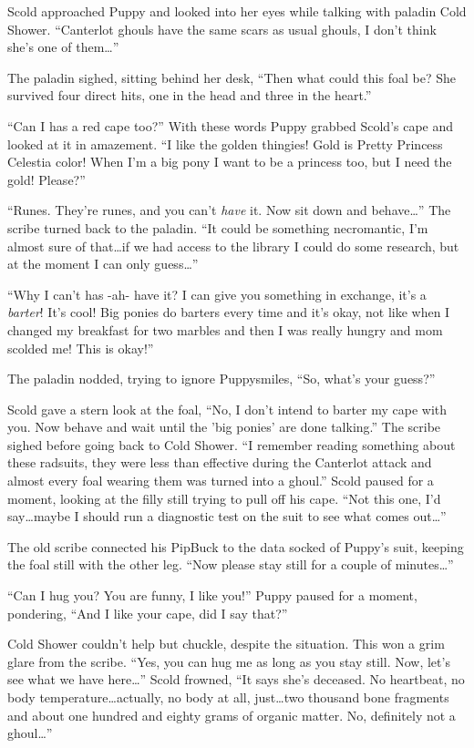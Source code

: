 Scold approached Puppy and looked into her eyes while talking with paladin Cold Shower. ``Canterlot ghouls have the same scars as usual ghouls, I don't think she's one of them\dots''

The paladin sighed, sitting behind her desk, ``Then what could this foal be? She survived four direct hits, one in the head and three in the heart.''

``Can I has a red cape too?'' With these words Puppy grabbed Scold's cape and looked at it in amazement. ``I like the golden thingies! Gold is Pretty Princess Celestia color! When I'm a big pony I want to be a princess too, but I need the gold! Please?''

``Runes. They're runes, and you can't \emph{have} it. Now sit down and behave\dots'' The scribe turned back to the paladin. ``It could be something necromantic, I'm almost sure of that\dots if we had access to the library I could do some research, but at the moment I can only guess\dots''

``Why I can't has -ah- have it? I can give you something in exchange, it's a \emph{barter}! It's cool! Big ponies do barters every time and it's okay, not like when I changed my breakfast for two marbles and then I was really hungry and mom scolded me! This is okay!''

The paladin nodded, trying to ignore Puppysmiles, ``So, what's your guess?''

Scold gave a stern look at the foal, ``No, I don't intend to barter my cape with you. Now behave and wait until the 'big ponies' are done talking.'' The scribe sighed before going back to Cold Shower. ``I remember reading something about these radsuits, they were less than effective during the Canterlot attack and almost every foal wearing them was turned into a ghoul.'' Scold paused for a moment, looking at the filly still trying to pull off his cape. ``Not this one, I'd say\dots maybe I should run a diagnostic test on the suit to see what comes out\dots''

The old scribe connected his PipBuck to the data socked of Puppy's suit, keeping the foal still with the other leg. ``Now please stay still for a couple of minutes\dots''

``Can I hug you? You are funny, I like you!'' Puppy paused for a moment, pondering, ``And I like your cape, did I say that?''

Cold Shower couldn't help but chuckle, despite the situation. This won a grim glare from the scribe. ``Yes, you can hug me as long as you stay still. Now, let's see what we have here\dots'' Scold frowned, ``It says she's deceased. No heartbeat, no body temperature\dots actually, no body at all, just\dots two thousand bone fragments and about one hundred and eighty grams of organic matter. No, definitely not a ghoul\dots''

